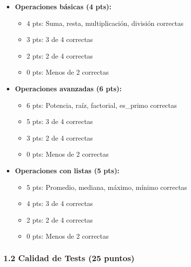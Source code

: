 \documentclass[12pt,a4paper]{article}
\begin{document}
\begin{itemize}[leftmargin=*]
    \item \textbf{Operaciones básicas (4 pts):}
    \begin{itemize}
        \item 4 pts: Suma, resta, multiplicación, división correctas
        \item 3 pts: 3 de 4 correctas
        \item 2 pts: 2 de 4 correctas
        \item 0 pts: Menos de 2 correctas
    \end{itemize}
    
    \item \textbf{Operaciones avanzadas (6 pts):}
    \begin{itemize}
        \item 6 pts: Potencia, raíz, factorial, es\_primo correctas
        \item 5 pts: 3 de 4 correctas
        \item 3 pts: 2 de 4 correctas
        \item 0 pts: Menos de 2 correctas
    \end{itemize}
    
    \item \textbf{Operaciones con listas (5 pts):}
    \begin{itemize}
        \item 5 pts: Promedio, mediana, máximo, mínimo correctas
        \item 4 pts: 3 de 4 correctas
        \item 2 pts: 2 de 4 correctas
        \item 0 pts: Menos de 2 correctas
    \end{itemize}
\end{itemize}

\subsubsection{1.2 Calidad de Tests (25 puntos)}
\end{document}
